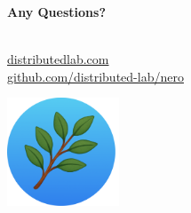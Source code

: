 \documentclass{zkdl-presentation-template}
\begin{document}
    \begin{frame}
        \centering
        \LARGE
        \textbf{Any Questions?} \\
        
        \vspace{0.2cm} \Huge {} \large \\
        
        \vspace{1cm}
  
        \href{https://distributedlab.com/}{\hspace{.325em}distributedlab.com} \\
  
        \href{https://github.com/rarimo/bionetta-tf}{\hspace{.325em}github.com/distributed-lab/nero}
        
        \begin{center}
            \includegraphics[width=0.25\textwidth]{logo.png}
        \end{center}
    \end{frame}
\end{document}
